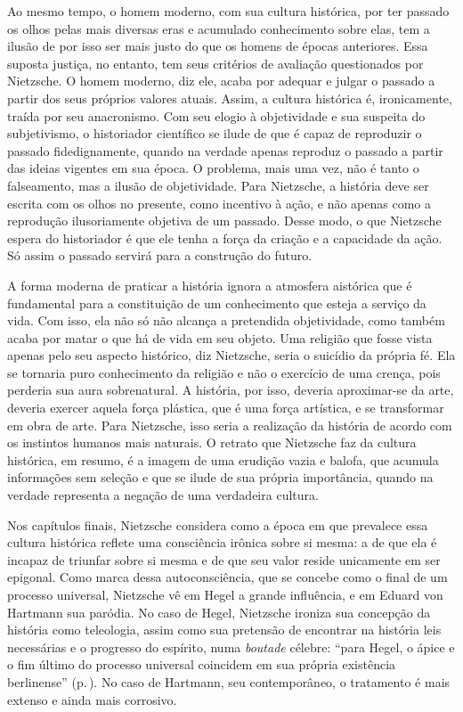 Ao mesmo tempo, o homem moderno, com sua cultura histórica, por ter
passado os olhos pelas mais diversas eras e acumulado conhecimento sobre
elas, tem a ilusão de por isso ser mais justo do que os homens de épocas
anteriores. Essa suposta justiça, no entanto, tem seus critérios de
avaliação questionados por Nietz\-sche. O homem moderno, diz ele, acaba
por adequar e julgar o passado a partir dos seus próprios valores
atuais. Assim, a cultura histórica é, ironicamente, traída por seu
anacronismo. Com seu elogio à objetividade e sua suspeita do
subjetivismo, o historiador científico se ilude de que é capaz de
reproduzir o passado fidedignamente, quando na verdade apenas reproduz o
passado a partir das ideias vigentes em sua época. O problema, mais uma
vez, não é tanto o falseamento, mas a ilusão de objetividade. Para
Nietz\-sche, a história deve ser escrita com os olhos no presente, como
incentivo à ação, e não apenas como a reprodução ilusoriamente objetiva
de um passado. Desse modo, o que Nietz\-sche espera do historiador é que
ele tenha a força da criação e a capacidade da ação. Só assim o passado
servirá para a construção do futuro.

A forma moderna de praticar a história ignora a atmosfera aistórica que
é fundamental para a constituição de um conhecimento que esteja a
serviço da vida. Com isso, ela não só não alcança a pretendida
objetividade, como também acaba por matar o que há de vida em seu
objeto. Uma religião que fosse vista apenas pelo seu aspecto histórico,
diz Nietz\-sche, seria o suicídio da própria fé. Ela se tornaria puro
conhecimento da religião e não o exercício de uma crença, pois perderia
sua aura sobrenatural. A história, por isso, deveria aproximar-se da
arte, deveria exercer aquela força plástica, que é uma força artística,
e se transformar em obra de arte. Para Nietz\-sche, isso seria a
realização da história de acordo com os instintos humanos mais naturais.
O retrato que Nietz\-sche faz da cultura histórica, em resumo, é a imagem
de uma erudição vazia e balofa, que acumula informações sem seleção e
que se ilude de sua própria importância, quando na verdade representa a
negação de uma verdadeira cultura.

Nos capítulos finais, Nietz\-sche considera como a época em que prevalece
essa cultura histórica reflete uma consciência irônica sobre si mesma: a
de que ela é incapaz de triunfar sobre si mesma e de que seu valor
reside unicamente em ser epigonal. Como marca dessa autoconsciência, que
se concebe como o final de um processo universal, Nietz\-sche vê em Hegel
a grande influência, e em Eduard von Hartmann sua paródia. No caso de
Hegel, Nietz\-sche ironiza sua concepção da história como teleologia,
assim como sua pretensão de encontrar na história leis necessárias e o
progresso do espírito, numa \emph{boutade} célebre: ``para Hegel, o
ápice e o fim último do processo universal coincidem em sua própria
existência berlinense'' (p.\,\pageref{existenciaberlinense}). 
No caso de Hartmann, seu contemporâneo, o
tratamento é mais extenso e ainda mais corrosivo.

